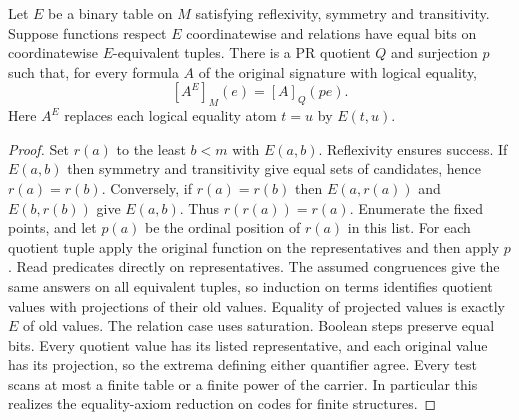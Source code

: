 \begin{theorem}\label{thm:eqquot}
Let $E$ be a binary table on $M$ satisfying reflexivity, symmetry and transitivity. Suppose functions respect $E$ coordinatewise and relations have equal bits on coordinatewise $E$-equivalent tuples. There is a PR quotient $Q$ and surjection $p$ such that, for every formula $A$ of the original signature with logical equality,
\[
 [A^{E}]_M(e)=[A]_Q(p e).
\]
Here $A^{E}$ replaces each logical equality atom $t=u$ by $E(t,u)$.
\end{theorem}
\begin{proof}
Set $r(a)$ to the least $b<m$ with $E(a,b)$. Reflexivity ensures success. If $E(a,b)$ then symmetry and transitivity give equal sets of candidates, hence $r(a)=r(b)$. Conversely, if $r(a)=r(b)$ then $E(a,r(a))$ and $E(b,r(b))$ give $E(a,b)$. Thus $r(r(a))=r(a)$. Enumerate the fixed points, and let $p(a)$ be the ordinal position of $r(a)$ in this list. For each quotient tuple apply the original function on the representatives and then apply $p$. Read predicates directly on representatives. The assumed congruences give the same answers on all equivalent tuples, so induction on terms identifies quotient values with projections of their old values. Equality of projected values is exactly $E$ of old values. The relation case uses saturation. Boolean steps preserve equal bits. Every quotient value has its listed representative, and each original value has its projection, so the extrema defining either quantifier agree. Every test scans at most a finite table or a finite power of the carrier. In particular this realizes the equality-axiom reduction on codes for finite structures.
\end{proof}

